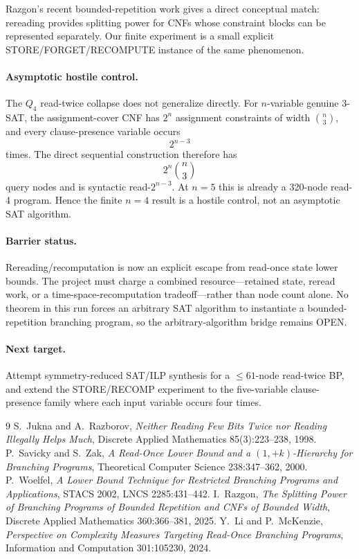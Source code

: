 Razgon's recent bounded-repetition work gives a direct conceptual match: rereading provides splitting power for CNFs whose constraint blocks can be represented separately. Our finite experiment is a small explicit STORE/FORGET/RECOMPUTE instance of the same phenomenon.

\paragraph{Asymptotic hostile control.}
The $Q_4$ read-twice collapse does not generalize directly. For $n$-variable genuine 3-SAT, the assignment-cover CNF has $2^n$ assignment constraints of width $\binom n3$, and every clause-presence variable occurs
\[2^{n-3}\]
times. The direct sequential construction therefore has
\[2^n\binom n3\]
query nodes and is syntactic read-$2^{n-3}$. At $n=5$ this is already a 320-node read-4 program. Hence the finite $n=4$ result is a hostile control, not an asymptotic SAT algorithm.

\paragraph{Barrier status.}
Rereading/recomputation is now an explicit escape from read-once state lower bounds. The project must charge a combined resource---retained state, reread work, or a time-space-recomputation tradeoff---rather than node count alone. No theorem in this run forces an arbitrary SAT algorithm to instantiate a bounded-repetition branching program, so the arbitrary-algorithm bridge remains OPEN.

\paragraph{Next target.}
Attempt symmetry-reduced SAT/ILP synthesis for a $\le61$-node read-twice BP, and extend the STORE/RECOMP experiment to the five-variable clause-presence family where each input variable occurs four times.

\begin{thebibliography}{9}
 S.~Jukna and A.~Razborov, \emph{Neither Reading Few Bits Twice nor Reading Illegally Helps Much}, Discrete Applied Mathematics 85(3):223--238, 1998.
 P.~Savicky and S.~Zak, \emph{A Read-Once Lower Bound and a $(1,+k)$-Hierarchy for Branching Programs}, Theoretical Computer Science 238:347--362, 2000.
 P.~Woelfel, \emph{A Lower Bound Technique for Restricted Branching Programs and Applications}, STACS 2002, LNCS 2285:431--442.
 I.~Razgon, \emph{The Splitting Power of Branching Programs of Bounded Repetition and CNFs of Bounded Width}, Discrete Applied Mathematics 360:366--381, 2025.
 Y.~Li and P.~McKenzie, \emph{Perspective on Complexity Measures Targeting Read-Once Branching Programs}, Information and Computation 301:105230, 2024.
\end{thebibliography}

